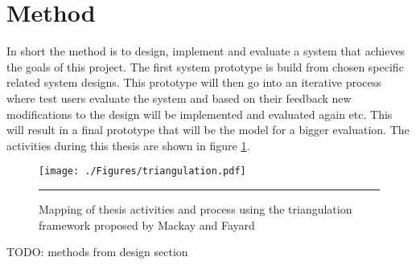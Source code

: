

\section{Method}
In short the method is to design, implement and evaluate a system that achieves the goals of this project. The first system prototype is build from chosen specific related system designs. This prototype will then go into an iterative process where test users evaluate the system and based on their feedback new modifications to the design will be implemented and evaluated again etc. This will result in a final prototype that will be the model for a bigger evaluation. The activities during this thesis are shown in figure \ref{fig:triangulation}.

\begin{figure}[htbp]
	\centering
		\texttt{[image: ./Figures/triangulation.pdf]}
		\rule{35em}{0.5pt}
	\caption[Triangulation]{Mapping of thesis activities and process using the triangulation framework proposed by Mackay and Fayard \cite{mackay_hci_1997}}
	\label{fig:triangulation}
\end{figure}

TODO: methods from design section






